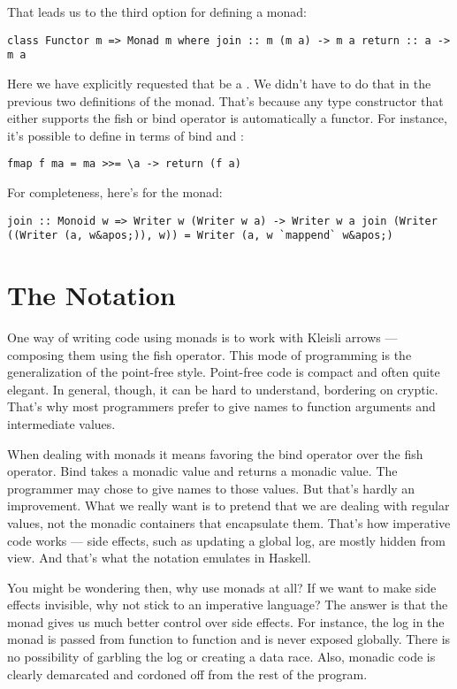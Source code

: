 That leads us to the third option for defining a monad:

\begin{verbatim}
class Functor m => Monad m where join :: m (m a) -> m a return :: a -> m a
\end{verbatim}

Here we have explicitly requested that  be a .
We didn't have to do that in the previous two definitions of the monad.
That's because any type constructor  that either supports the
fish or bind operator is automatically a functor. For instance, it's
possible to define  in terms of bind and :

\begin{verbatim}
fmap f ma = ma >>= \a -> return (f a)
\end{verbatim}

For completeness, here's  for the  monad:

\begin{verbatim}
join :: Monoid w => Writer w (Writer w a) -> Writer w a join (Writer ((Writer (a, w&apos;)), w)) = Writer (a, w `mappend` w&apos;)
\end{verbatim}

\section{\texorpdfstring{The 
Notation}{The do Notation}}\label{the-do-notation}

One way of writing code using monads is to work with Kleisli arrows ---
composing them using the fish operator. This mode of programming is the
generalization of the point-free style. Point-free code is compact and
often quite elegant. In general, though, it can be hard to understand,
bordering on cryptic. That's why most programmers prefer to give names
to function arguments and intermediate values.

When dealing with monads it means favoring the bind operator over the
fish operator. Bind takes a monadic value and returns a monadic value.
The programmer may chose to give names to those values. But that's
hardly an improvement. What we really want is to pretend that we are
dealing with regular values, not the monadic containers that encapsulate
them. That's how imperative code works --- side effects, such as
updating a global log, are mostly hidden from view. And that's what the
 notation emulates in Haskell.

You might be wondering then, why use monads at all? If we want to make
side effects invisible, why not stick to an imperative language? The
answer is that the monad gives us much better control over side effects.
For instance, the log in the  monad is passed from
function to function and is never exposed globally. There is no
possibility of garbling the log or creating a data race. Also, monadic
code is clearly demarcated and cordoned off from the rest of the
program.

